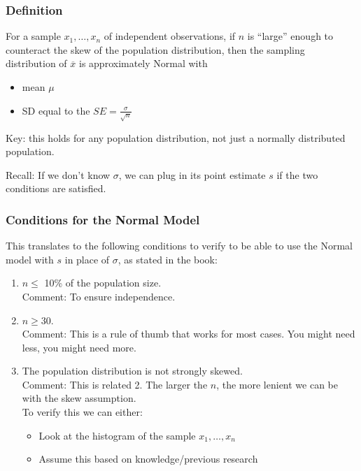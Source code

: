 \documentclass[slides]{beamer}
\newcommand{\blue}[1]{\textcolor{blue2}{#1}}
\newcommand{\xbar}{\overline{x}}
\begin{document}
\begin{frame}
\frametitle{Definition}

For a sample $x_1, \ldots, x_n$ of \blue{independent} observations, if $n$ is ``large'' enough to counteract the skew of the population distribution, then the sampling distribution of $\xbar$ is approximately Normal with
\begin{itemize}
\item mean $\mu$
\item SD equal to the $SE=\frac{\sigma}{\sqrt{n}}$
\end{itemize}

\vspace{0.25cm}

\pause\blue{Key}:  this holds for any population distribution, not just a normally distributed population.  

\vspace{0.25cm}

\pause \blue{Recall}: If we don't know $\sigma$, we can plug in its point estimate $s$ if the two conditions are satisfied.  


\end{frame}


\begin{frame}
\frametitle{Conditions for the Normal Model}

This translates to the following conditions to verify to be able to use the Normal model with $s$ in place of $\sigma$, as stated in the book:

\begin{enumerate}
\pause\item $n\leq$ 10\% of the population size.\\
\pause Comment:  To ensure independence.
\pause\item $n \geq 30$.\\
\pause Comment:  This is a \blue{rule of thumb} that works for most cases.  You might need less, you might need more.
\pause \item The population distribution is not strongly skewed.\\
Comment: This is related \blue{2}.  The larger the $n$, the more lenient we can be with the skew assumption.\\
To verify this we can either:
\begin{itemize}
\item Look at the histogram of the sample $x_1, \ldots, x_n$
\item Assume this based on knowledge/previous research
\end{itemize}
\end{enumerate}

\end{frame}
\end{document}

